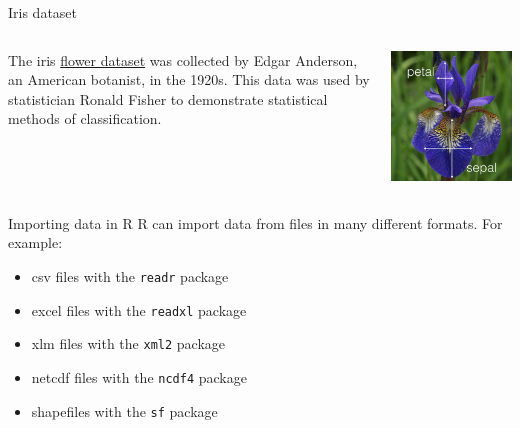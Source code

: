 \documentclass[
  ignorenonframetext,
  aspectratio=169,
]{beamer}
\providecommand{\tightlist}{%
  \setlength{\itemsep}{0pt}\setlength{\parskip}{0pt}}\usepackage{longtable,booktabs,array}
\begin{document}
\begin{frame}{Iris dataset}
\label{iris-dataset}
\begin{columns}[T]
\begin{column}{0.4\textwidth}
The iris
\href{https://en.wikipedia.org/wiki/Iris_flower_data_set}{flower
dataset} was collected by Edgar Anderson, an American botanist, in the
1920s. This data was used by statistician Ronald Fisher to demonstrate
statistical methods of classification.
\end{column}

\begin{column}{0.6\textwidth}
\includegraphics[width=1\textwidth,height=\textheight]{Intro_R_files/mediabag/iris_flower.png}
\end{column}
\end{columns}
\end{frame}

\begin{frame}[fragile]{Importing data in R}
\label{importing-data-in-r}
R can import data from files in many different formats. For example:

\begin{itemize}
\tightlist
\item
  csv files with the \texttt{readr} package
\item
  excel files with the \texttt{readxl} package
\item
  xlm files with the \texttt{xml2} package
\item
  netcdf files with the \texttt{ncdf4} package
\item
  shapefiles with the \texttt{sf} package
\end{itemize}
\end{frame}
\end{document}
